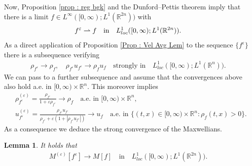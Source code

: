 \documentclass{amsart}
\theoremstyle{plain}
\newtheorem{lemma}[theorem]{Lemma}
\theoremstyle{remark}
\numberwithin{equation}{section}
\newcommand{\R}{\mathbb{R}}
\newcommand{\ve}{\varepsilon}
\newcommand{\weakto}{\rightharpoonup}
\begin{document}
Now, Proposition \ref{prop : reg bgk} and the Dunford--Pettis theorem imply that there is a limit $f\in L^\infty([0,\infty); L^1(\R^{2n}))$ with
\begin{align*}
    f^\ve \weakto f \quad \text{in} \quad L^{1}_{\rm loc}([0,\infty);L^1(\R^{2n})).
\end{align*}
As a direct application of Proposition \ref{Prop : Vel Avg Lem} to the sequence $\{f^\ve\}$ there is a subsequence verifying
\begin{align*}
    \rho_{f^\ve} \to \rho_f, \quad \rho_{f^\ve}u_{f^\ve}\to \rho_f u_f \quad\text{strongly in}\quad L^1_{loc}([0,\infty);L^1(\R^n)).
\end{align*}
We can pass to a further subsequence and assume that the convergences above also hold a.e. in $[0,\infty)\times \R^n$. This moreover implies
\begin{align*}
    &\rho_{f^\ve}^{(\ve)} = \frac{\rho_{f^\ve}}{1 + \ve \rho_{f^\ve}} \to \rho_f \quad \text{a.e. in }[0,\infty)\times \R^n,\\
    &u_{f^\ve}^{(\ve)} = \frac{\rho_{f^\ve}u_{f^\ve}}{\rho_{f^\ve} + \ve(1+|\rho_{f^\ve}u_{f^\ve}|)} \to u_f \quad \text{a.e. in }\{(t,x)\in [0,\infty)\times\R^n :\rho_f(t,x)>0\}.
\end{align*}
As a consequence we deduce the strong convergence of the Maxwellians.
\begin{lemma}\label{lem:Msc}
    It holds that
    \begin{align*}
        M^{(\ve)}[f^\ve] \to M[f] \quad\text{in}\quad L^1_{loc}([0,\infty);L^1(\R^{2n})).
    \end{align*}
\end{lemma}
\end{document}
